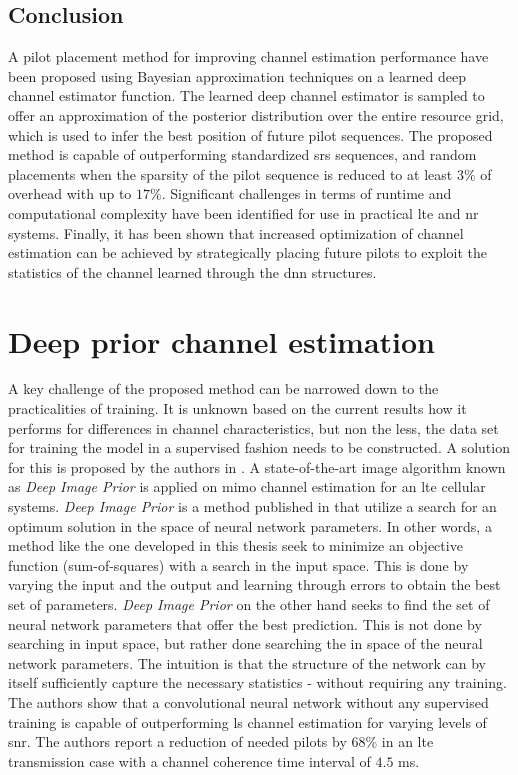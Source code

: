 \subsection{Conclusion}
A pilot placement method for improving channel estimation performance have been proposed using Bayesian approximation techniques on a learned deep channel estimator function. The learned deep channel estimator is sampled to offer an approximation of the posterior distribution over the entire resource grid, which is used to infer the best position of future pilot sequences. The proposed method is capable of outperforming standardized \gls{srs} sequences, and random placements when the sparsity of the pilot sequence is reduced to at least $3\%$ of overhead with up to $17\%$. Significant challenges in terms of runtime and computational complexity have been identified for use in practical \gls{lte} and \gls{nr} systems. Finally, it has been shown that increased optimization of channel estimation can be achieved by strategically placing future pilots to exploit the statistics of the channel learned through the \gls{dnn} structures.

\section{Deep prior channel estimation}\label{sec:research_trends_channel_estimation}
A key challenge of the proposed method can be narrowed down to the practicalities of training. It is unknown based on the current results how it performs for differences in channel characteristics, but non the less, the data set for training the model in a supervised fashion needs to be constructed. A solution for this is proposed by the authors in \cite{Balevi2019}. A state-of-the-art image algorithm known as \emph{Deep Image Prior} is applied on \gls{mimo} channel estimation for an \gls{lte} cellular systems. \emph{Deep Image Prior} is a method published in \cite{DeepPrior} that utilize a search for an optimum solution in the space of neural network parameters. In other words, a method like the one developed in this thesis seek to minimize an objective function (sum-of-squares) with a search in the input space. This is done by varying the input and the output and learning through errors to obtain the best set of parameters. \emph{Deep Image Prior} on the other hand seeks to find the set of neural network parameters that offer the best prediction. This is not done by searching in input space, but rather done searching the in space of the neural network parameters. The intuition is that the structure of the network can by itself sufficiently capture the necessary statistics - without requiring any training. The authors show that a convolutional neural network without any supervised training is capable of outperforming \gls{ls} channel estimation for varying levels of \gls{snr}. The authors report a reduction of needed pilots by $68\%$ in an \gls{lte} transmission case with a channel coherence time interval of $4.5$ ms.

